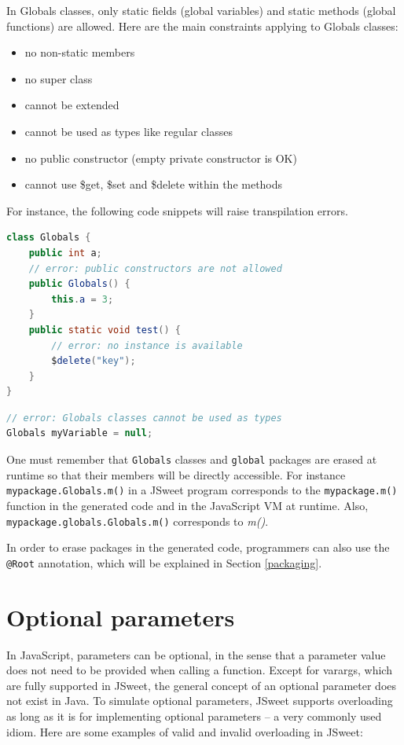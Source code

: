 \documentclass[a4paper]{report}
\begin{document}
In Globals classes, only static fields (global variables) and static methods (global functions) are allowed. Here are the main constraints applying to Globals classes:

\begin{itemize}
\item no non-static members
\item no super class
\item cannot be extended
\item cannot be used as types like regular classes
\item no public constructor (empty private constructor is OK)
\item cannot use \$get, \$set and \$delete within the methods
\end{itemize}

For instance, the following code snippets will raise transpilation errors.

\begin{lstlisting}[language=Java]
class Globals {
	public int a;
	// error: public constructors are not allowed
	public Globals() {
		this.a = 3;
	}
	public static void test() {
		// error: no instance is available
		$delete("key");
	}
}
\end{lstlisting}

\begin{lstlisting}[language=Java]
// error: Globals classes cannot be used as types
Globals myVariable = null;
\end{lstlisting}

One must remember that \texttt{Globals} classes and \texttt{global} packages are erased at runtime so that their members will be directly accessible. For instance \texttt{mypackage.Globals.m()} in a JSweet program corresponds to the \texttt{mypackage.m()} function in the generated code and in the JavaScript VM at runtime. Also, \texttt{mypackage.globals.Globals.m()} corresponds to \emph{m()}.

In order to erase packages in the generated code, programmers can also use the \texttt{@Root} annotation, which will be explained in Section \ref{packaging}.

\section{Optional parameters} 
\label{optional-parameters}

In JavaScript, parameters can be optional, in the sense that a parameter value does not need to be provided when calling a function. Except for varargs, which are fully supported in JSweet, the general concept of an optional parameter does not exist in Java. To simulate optional parameters, JSweet supports overloading as long as it is for implementing optional parameters -- a very commonly used idiom. Here are some examples of valid and invalid overloading in JSweet:
\end{document}
